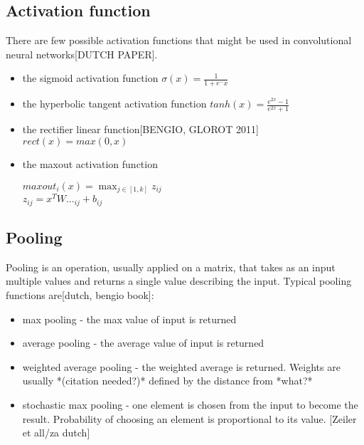 \documentclass[a4paper,10pt]{report}
\begin{document}
	  
	
	\subsection{Activation function}
	  There are few possible activation functions that might be used in convolutional neural networks[DUTCH PAPER].
	  \begin{itemize}
	   \item the sigmoid activation function $\sigma(x) = \frac{1}{1 + e^-x}$
	   \item the hyperbolic tangent activation function $tanh(x) = \frac{e^{2x} - 1}{e^{2x} + 1}$
	   \item the rectifier linear function[BENGIO, GLOROT 2011] $rect(x) = max(0,x)$ %
	   \item the maxout activation function
	    \begin{center}
	      $maxout_i(x) = \max_{j \in [1, k]}z_{ij}$\\
	      $z_{ij}=x^TW..._{ij} + b_{ij} $ %
	    \end{center}
	  \end{itemize}

	
	\subsection{Pooling} %
	  Pooling is an operation, usually applied on a matrix, that takes as an input multiple values and returns a single value describing the input. Typical pooling functions are[dutch, bengio book]:
	  \begin{itemize}
	    \item max pooling - the max value of input is returned
	    \item average pooling - the average value of input is returned
	    \item weighted average pooling - the weighted average is returned. Weights are usually *(citation needed?)* defined by the distance from *what?* %
	    \item stochastic max pooling - one element is chosen from the input to become the result. Probability of choosing an element is proportional to its value. [Zeiler et all/za dutch]\\
	  \end{itemize}
	  
\end{document}
